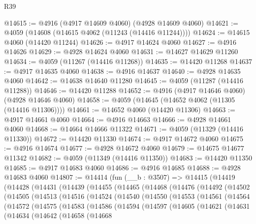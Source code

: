 \begin{lexlean}{R39}
\begin{coremodule}
@14615 := @4916 (@4917 @14609 @4060) (@4928 @14609 @4060)
@14621 := @4059 (@14608 (@14615 @4062 (@11243 (@14416 @11244))))
@14624 := @14615 @4060 (@14420 @11244)
@14626 := @4917 @14624 @4060
@14627 := @4916 @14626
@14629 := @4928 @14624 @4060
@14631 := @14627 @14629 @11260
@14634 := @4059 (@11267 (@14416 @11268))
@14635 := @14420 @11268
@14637 := @4917 @14635 @4060
@14638 := @4916 @14637
@14640 := @4928 @14635 @4060
@14642 := @14638 @14640 @11280
@14645 := @4059 (@11287 (@14416 @11288))
@14646 := @14420 @11288
@14652 := @4916 (@4917 @14646 @4060) (@4928 @14646 @4060)
@14658 := @4059 (@14645 (@14652 @4062 (@11305 (@14416 @11306))))
@14661 := @14652 @4060 (@14420 @11306)
@14663 := @4917 @14661 @4060
@14664 := @4916 @14663
@14666 := @4928 @14661 @4060
@14668 := @14664 @14666 @11322
@14671 := @4059 (@11329 (@14416 @11330))
@14672 := @14420 @11330
@14674 := @4917 @14672 @4060
@14675 := @4916 @14674
@14677 := @4928 @14672 @4060
@14679 := @14675 @14677 @11342
@14682 := @4059 (@11349 (@14416 @11350))
@14683 := @14420 @11350
@14685 := @4917 @14683 @4060
@14686 := @4916 @14685
@14688 := @4928 @14683 @4060
@14807 := @14414
    (fun (__b : @3507) =>
    @14415
      (@14419
        (@14428
          (@14431
            (@14439
              (@14455
                (@14465
                  (@14468
                    (@14476
                      (@14492
                        (@14502
                          (@14505
                            (@14513
                              (@14516
                                (@14524
                                  (@14540
                                    (@14550
                                      (@14553
                                        (@14561
                                          (@14564
                                            (@14572
                                              (@14575
                                                (@14583
                                                  (@14586
                                                    (@14594
                                                      (@14597
                                                        (@14605
                                                          (@14621
                                                            (@14631
                                                              (@14634
                                                                (@14642
                                                                  (@14658
                                                                    (@14668

\end{coremodule}
\end{lexlean}
